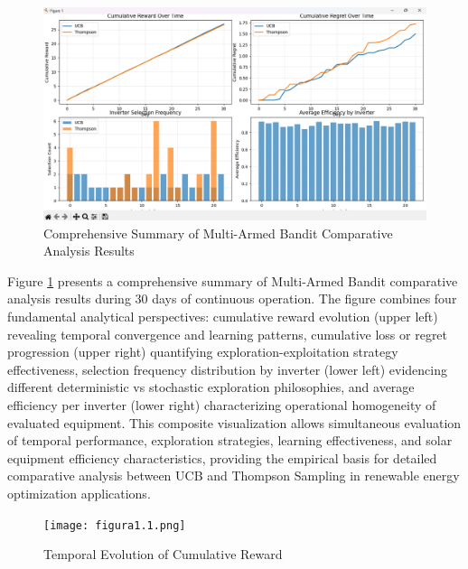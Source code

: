 \documentclass[conference]{IEEEtran}
\begin{document}
\begin{figure}[H]
\centering
\includegraphics[width=1.0\columnwidth]{figura1.png}
\caption{Comprehensive Summary of Multi-Armed Bandit Comparative Analysis Results}
\label{fig:results_combined}
\end{figure}

Figure \ref{fig:results_combined} presents a comprehensive summary of Multi-Armed Bandit comparative analysis results during 30 days of continuous operation. The figure combines four fundamental analytical perspectives: cumulative reward evolution (upper left) revealing temporal convergence and learning patterns, cumulative loss or regret progression (upper right) quantifying exploration-exploitation strategy effectiveness, selection frequency distribution by inverter (lower left) evidencing different deterministic vs stochastic exploration philosophies, and average efficiency per inverter (lower right) characterizing operational homogeneity of evaluated equipment. This composite visualization allows simultaneous evaluation of temporal performance, exploration strategies, learning effectiveness, and solar equipment efficiency characteristics, providing the empirical basis for detailed comparative analysis between UCB and Thompson Sampling in renewable energy optimization applications.

\begin{figure}[H]
\centering
\texttt{[image: figura1.1.png]}
\caption{Temporal Evolution of Cumulative Reward}
\label{fig:1.1}
\end{figure}
\end{document}
